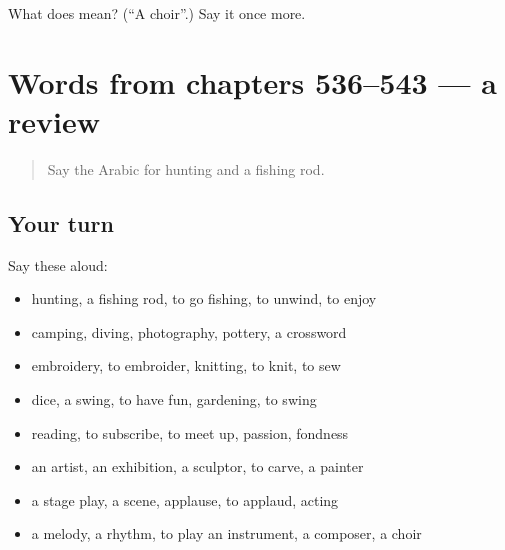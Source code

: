 \begin{tcolorbox}[breakable,colback=teal!4,colframe=teal!35!black,title={Before you move on}]
What does  mean? (\textquotedblleft{}A choir\textquotedblright{}.) Say it once more.
\end{tcolorbox}
\section[(dialogue)]{Words from chapters 536–543 — a review}

\label{lesson:AR-R543-review-536-543}



\begin{quote}
Say the Arabic for hunting and a fishing rod.
\end{quote}

\subsection*{Your turn}
Say these aloud:

\begin{itemize}
\raggedright
  \item hunting, a fishing rod, to go fishing, to unwind, to enjoy
  \item camping, diving, photography, pottery, a crossword
  \item embroidery, to embroider, knitting, to knit, to sew
  \item dice, a swing, to have fun, gardening, to swing
  \item reading, to subscribe, to meet up, passion, fondness
  \item an artist, an exhibition, a sculptor, to carve, a painter
  \item a stage play, a scene, applause, to applaud, acting
  \item a melody, a rhythm, to play an instrument, a composer, a choir
\end{itemize}

